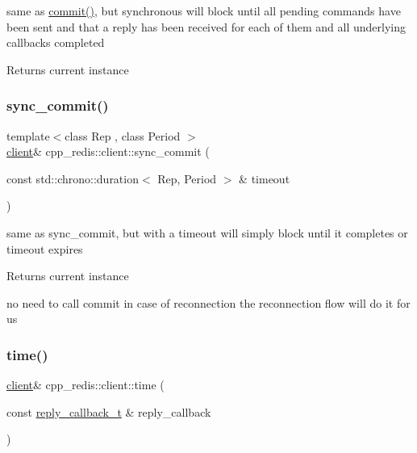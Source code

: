 same as \hyperlink{classcpp__redis_1_1client_a36a48d61a4900e88fd67795ca59cbea3}{commit()}, but synchronous will block until all pending commands have been sent and that a reply has been received for each of them and all underlying callbacks completed

\begin{DoxyReturn}{Returns}
current instance 
\end{DoxyReturn}
\mbox{\label{classcpp__redis_1_1client_a79a24c8367cb1229fd2c4c38d0f82533}} 
\subsubsection{\texorpdfstring{sync\+\_\+commit()}{sync\_commit()}\hspace{0.1cm}{\footnotesize\ttfamily [2/2]}}
{\footnotesize\ttfamily template$<$class Rep , class Period $>$ \\
\hyperlink{classcpp__redis_1_1client}{client}\& cpp\+\_\+redis\+::client\+::sync\+\_\+commit (\begin{DoxyParamCaption}\item[{const std\+::chrono\+::duration$<$ Rep, Period $>$ \&}]{timeout }\end{DoxyParamCaption})\hspace{0.3cm}{\ttfamily [inline]}}

same as sync\+\_\+commit, but with a timeout will simply block until it completes or timeout expires

\begin{DoxyReturn}{Returns}
current instance 
\end{DoxyReturn}
no need to call commit in case of reconnection the reconnection flow will do it for us \mbox{\label{classcpp__redis_1_1client_aa98df57ae17365aaf0405b60f4711e92}} 
\subsubsection{\texorpdfstring{time()}{time()}\hspace{0.1cm}{\footnotesize\ttfamily [1/2]}}
{\footnotesize\ttfamily \hyperlink{classcpp__redis_1_1client}{client}\& cpp\+\_\+redis\+::client\+::time (\begin{DoxyParamCaption}\item[{const \hyperlink{classcpp__redis_1_1client_a061a1140d36d2eaeda82b09a0bb3f9f2}{reply\+\_\+callback\+\_\+t} \&}]{reply\+\_\+callback }\end{DoxyParamCaption})}

